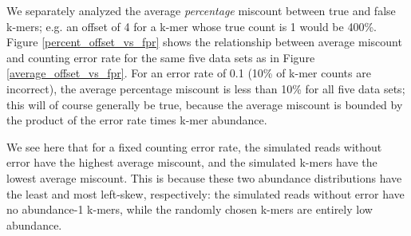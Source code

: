 \documentclass{article}
\begin{document}
\begin{table}[ht]
\caption{Data sets used for analyzing miscounts.}
\label{random_data}
\end{table}



We separately analyzed the average {\em percentage} miscount between
true and false k-mers; e.g. an offset of 4 for a k-mer whose true
count is 1 would be 400\%.  Figure \ref{percent_offset_vs_fpr} shows the relationship between average 
miscount and counting error rate for the same five data sets as in Figure \ref{average_offset_vs_fpr}.  
For an error rate of 0.1 (10\% of k-mer counts are incorrect), the average percentage miscount 
is less than 10\% for all five data sets; this will of course generally be true, 
because the average miscount is bounded by the product of the error rate times k-mer abundance.

We see here that for a fixed counting error rate, the simulated reads
without error have the highest average miscount, and the simulated
k-mers have the lowest average miscount.  This is because these two
abundance distributions have the least and most left-skew,
respectively: the simulated reads without error have no abundance-1
k-mers, while the randomly chosen k-mers are entirely low abundance.
\end{document}

